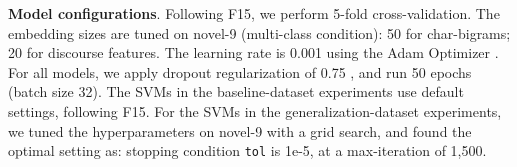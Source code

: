 \begin{table}[t]
\begin{center}
\caption{Macro-averaged F1 score for multi-class author classification on the novel-9 dataset, using either no discourse (None), grammatical relations (GR), or RST relations (RST). These experiments additionally include the Discourse Embedding (DE) models for GR and RST. ($^\ast$ indicates stat. sig. at p$<$0.005 compared to its SVM counterpart).}
\label{tab-num2:exp1}
\end{center}
\end{table}

\noindent
\textbf{Model configurations}.
Following F15, we perform 5-fold cross-validation.
The embedding sizes are tuned on novel-9 (multi-class condition): 50 for char-bigrams; 20 for discourse features. 
The learning rate is 0.001 using the Adam Optimizer \citep{Kingma:2014}.
For all models, we apply dropout regularization of 0.75 \citep{Srivastava:2014}, and run 50 epochs (batch size 32).
The SVMs in the baseline-dataset experiments use default settings, following F15.
For the SVMs in the generalization-dataset experiments, we tuned the hyperparameters on novel-9 with a grid search, and found the optimal setting as: stopping condition \texttt{tol} is 1e-5, at a max-iteration of 1,500. 

